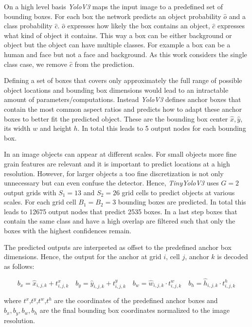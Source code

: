 	On a high level basis \textit{YoloV3} maps the input image to a predefined set of bounding boxes. For each box the network predicts an object probability $\hat o$  and a class probability $\hat c$. $\hat o$ expresses how likely the box contains an object, $\hat c$ expresses what kind of object it contains. This way a box can be either background or object but the object can have multiple classes. For example a box can be a human and face but not a face and background. As this work considers the single class case, we remove $\hat c$ from the prediction.
	
	Defining a set of boxes that covers only approximately the full range of possible object locations and bounding box dimensions would lead to an intractable amount of parameters/computations. Instead \textit{YoloV3} defines anchor boxes that contain the most common aspect ratios and predicts how to adapt these anchor boxes to better fit the predicted object. These are the bounding box center $\hat x,\hat y$, its width $w$ and height $h$. In total this leads to 5 output nodes for each bounding box.
	
	In an image objects can appear at different scales. For small objects more fine grain features are relevant and it is important to predict locations at a high resolution. However, for larger objects a too fine discretization is not only unnecessary but can even confuse the detector. Hence, \textit{TinyYoloV3} uses $G=2$ output grids with $S_1=13$ and $S_2=26$ grid cells to predict objects at various scales. For each grid cell $B_1 = B_2 = 3$ bounding boxes are predicted. In total this leads to 12675 output nodes that predict 2535 boxes. In a last step boxes that contain the same class and have a high overlap are filtered such that only the boxes with the highest confidences remain.
	
	The predicted outputs are interpreted as offset to the predefined anchor box dimensions. Hence, the output for the anchor at grid $i$, cell $j$, anchor $k$  is decoded as follows:
	
	\begin{equation}
	b_x = \hat x_{i,j,k} + t^x_{i,j,k}\quad
	b_y = \hat y_{i,j,k} + t^y_{i,j,k}\quad
	b_w = \hat w_{i,j,k} \cdot t^w_{i,j,k}\quad
	b_h = \hat h_{i,j,k} \cdot t^h_{i,j,k}
	\end{equation}
	
	where $t^x$,$t^y$,$t^w$,$t^h$ are the coordinates of the predefined anchor boxes and $b_x,b_y,b_w,b_h$ are the final bounding box coordinates normalized to the image resolution.
		
